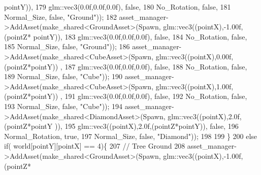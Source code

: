 \begin{DoxyCode}
      pointY)),
179                                                              glm::vec3(0.0f,0.0f,0.0f), \textcolor{keyword}{false},
180                                                              No\_Rotation, \textcolor{keyword}{false},
181                                                              Normal\_Size, \textcolor{keyword}{false}, \textcolor{stringliteral}{"Ground"}));
182             asset\_manager->AddAsset(make\_shared<GroundAsset>(Spawn, glm::vec3((pointX),-1.00f,(pointZ*
      pointY)),
183                                                              glm::vec3(0.0f,0.0f,0.0f), \textcolor{keyword}{false},
184                                                              No\_Rotation, \textcolor{keyword}{false},
185                                                              Normal\_Size, \textcolor{keyword}{false}, \textcolor{stringliteral}{"Ground"}));
186             asset\_manager->AddAsset(make\_shared<CubeAsset>(Spawn, glm::vec3((pointX),0.00f,(pointZ*pointY))
      , 
187                                                            glm::vec3(0.0f,0.0f,0.0f), \textcolor{keyword}{false},
188                                                            No\_Rotation, \textcolor{keyword}{false},
189                                                            Normal\_Size, \textcolor{keyword}{false}, \textcolor{stringliteral}{"Cube"}));
190             asset\_manager->AddAsset(make\_shared<CubeAsset>(Spawn, glm::vec3((pointX),1.00f,(pointZ*pointY))
      , 
191                                                            glm::vec3(0.0f,0.0f,0.0f), \textcolor{keyword}{false},
192                                                            No\_Rotation, \textcolor{keyword}{false},
193                                                            Normal\_Size, \textcolor{keyword}{false}, \textcolor{stringliteral}{"Cube"}));
194             asset\_manager->AddAsset(make\_shared<DiamondAsset>(Spawn, glm::vec3((pointX),2.0f,(pointZ*pointY
      )), 
195                                                              glm::vec3((pointX),2.0f,(pointZ*pointY)), \textcolor{keyword}{
      false},
196                                                              Normal\_Rotation, \textcolor{keyword}{true},
197                                                              Normal\_Size, \textcolor{keyword}{false}, \textcolor{stringliteral}{"Diamond"}));
198 
199    \}
200    \textcolor{keywordflow}{else} \textcolor{keywordflow}{if}( world[pointY][pointX] == 4)\{
207             \textcolor{comment}{// Tree Ground}
208             asset\_manager->AddAsset(make\_shared<GroundAsset>(Spawn, glm::vec3((pointX),-1.00f,(pointZ*

\end{DoxyCode}
